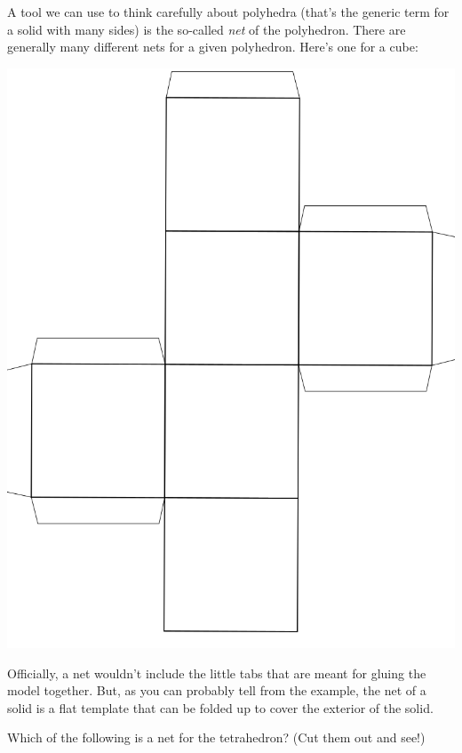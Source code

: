 \wbvfill

\wbnewpage

A tool we can use to think carefully about polyhedra (that's the generic term for a solid with many sides) is the so-called {\em net} of the polyhedron.  There are generally many different nets for a given polyhedron.  Here's one for a cube:
\bigskip

\centerline{\includegraphics[scale=.25]{images/cube-net.png}}

Officially, a net wouldn't include the little tabs that are meant for gluing the model together. But, as you can probably tell from the example, the net of a solid is a flat template that can be folded up to cover the exterior of the solid.

Which of the following is a net for the tetrahedron? (Cut them out and see!)
\bigskip

